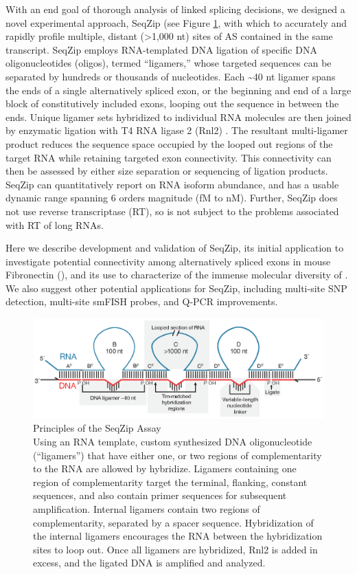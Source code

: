 	With an end goal of thorough analysis of linked splicing decisions, we designed a novel experimental approach, SeqZip (see Figure \ref{SeqZipPaper:fig:Roy2014 F1}, with which to accurately and rapidly profile multiple, distant (>1,000 nt) sites of AS contained in the same transcript. SeqZip employs RNA-templated DNA ligation of specific DNA oligonucleotides (oligos), termed ``ligamers,'' whose targeted sequences can be separated by hundreds or thousands of nucleotides. Each \textasciitilde 40 nt ligamer spans the ends of a single alternatively spliced exon, or the beginning and end of a large block of constitutively included exons, looping out the sequence in between the ends. Unique ligamer sets hybridized to individual RNA molecules are then joined by enzymatic ligation with T4 RNA ligase 2 (Rnl2) \citep{Ho2002b}. The resultant multi-ligamer product reduces the sequence space occupied by the looped out regions of the target RNA while retaining targeted exon connectivity. This connectivity can then be assessed by either size separation or sequencing of ligation products. SeqZip can quantitatively report on RNA isoform abundance, and has a usable dynamic range spanning 6 orders magnitude (fM to nM). Further, SeqZip does not use reverse transcriptase (RT), so is not subject to the problems associated with RT of long RNAs.

	Here we describe development and validation of SeqZip, its initial application to investigate potential connectivity among alternatively spliced exons in mouse Fibronectin (\fn{}), and its use to characterize of the immense molecular diversity of \dscam{}. We also suggest other potential applications for SeqZip, including multi-site SNP detection, multi-site smFISH probes, and Q-PCR improvements.

	\begin{figure} %
		\centering 
		\includegraphics{Figures/SeqZipPaper/Roy2014Fig1.eps}
		\caption[Principles of the SeqZip Assay]
		{
			Principles of the SeqZip Assay\\[0.25cm]
			Using an RNA template, custom synthesized DNA oligonucleotide (``ligamers'') that have either one, or two regions of complementarity to the RNA are allowed by hybridize. Ligamers containing one region of complementarity target the terminal, flanking, constant sequences, and also contain primer sequences for subsequent amplification. Internal ligamers contain two regions of complementarity, separated by a spacer sequence. Hybridization of the internal ligamers encourages the RNA between the hybridization sites to loop out. Once all ligamers are hybridized, Rnl2 is added in excess, and the ligated DNA is amplified and analyzed.
			}
		\label{SeqZipPaper:fig:Roy2014 F1}
		\end{figure}

